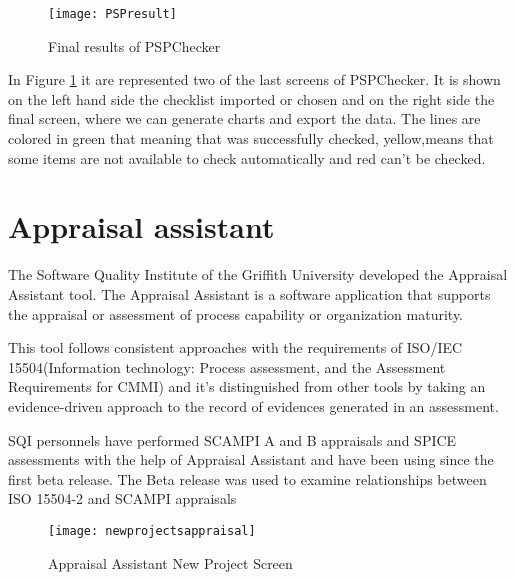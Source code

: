 \begin{figure}[h]
	\begin{center}
		\leavevmode
		\texttt{[image: PSPresult]}
		\caption{Final results of PSPChecker}
		\label{fig:PSPresults}
	\end{center}
\end{figure}

In Figure \ref{fig:PSPresults} it are represented two of the last screens of PSPChecker. It is shown on the left hand side the checklist imported or chosen and on the right side the final screen, where we can generate charts and export the data. The lines are colored in green that meaning that was successfully checked, yellow,means that some items are not available to check automatically and red can't be checked. 

\section{Appraisal assistant}

The Software Quality Institute of the Griffith University\citep{SoftwareQuality2015} developed the Appraisal Assistant tool. The Appraisal Assistant\citep{Appraisal2015} is a software application that supports the appraisal or assessment of process capability or organization maturity.

This tool follows consistent approaches with the requirements of ISO/IEC 15504(Information technology: Process assessment, and the Assessment Requirements for CMMI)\citep{ISOIEC} and it's distinguished from other tools by taking an evidence-driven approach to the record of evidences generated in an assessment.

SQI personnels have performed SCAMPI A and B appraisals and SPICE assessments with the help of Appraisal Assistant and have been using since the first beta release. The Beta release was used to examine relationships between ISO 15504-2 and SCAMPI appraisals

\begin{figure}[h]
	\begin{center}
		\leavevmode
		\texttt{[image: newprojectsappraisal]}
		\caption{Appraisal Assistant New Project Screen}
		\label{fig:newprojectsappraisal}
	\end{center}
\end{figure}

